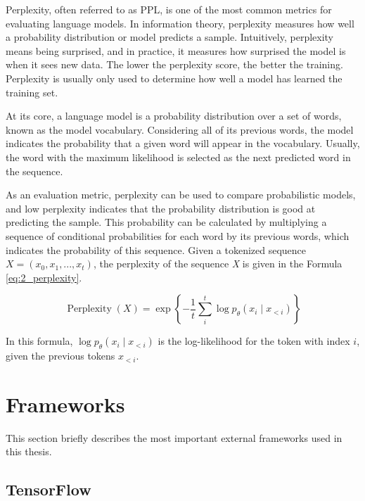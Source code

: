     Perplexity, often referred to as PPL, is one of the most common metrics for evaluating language models. In information theory, perplexity measures how well a probability distribution or model predicts a sample. Intuitively, perplexity means being surprised, and in practice, it measures how surprised the model is when it sees new data. The lower the perplexity score, the better the training. Perplexity is usually only used to determine how well a model has learned the training set. 

    At its core, a language model is a probability distribution over a set of words, known as the model vocabulary. Considering all of its previous words, the model indicates the probability that a given word will appear in the vocabulary. Usually, the word with the maximum likelihood is selected as the next predicted word in the sequence.

    As an evaluation metric, perplexity can be used to compare probabilistic models, and low perplexity indicates that the probability distribution is good at predicting the sample. This probability can be calculated by multiplying a sequence of conditional probabilities for each word by its previous words, which indicates the probability of this sequence.
    Given a tokenized sequence $X = (x_0, x_1, ..., x_t)$, the perplexity of the sequence \textit{X} is given in the Formula \ref{eq:2_perplexity}.
        

    \begin{equation}
    \operatorname{Perplexity}(X)=\exp \left\{-\frac{1}{t} \sum_i^t \log p_\theta\left(x_i \mid x_{<i}\right)\right\}
    \label{eq:2_perplexity}
    \end{equation}

    In this formula, $\log p_\theta\left(x_i \mid x_{<i}\right)$ is the log-likelihood for the token with index $i$, given the previous tokens $x_{<i}$.

\section{Frameworks}
    This section briefly describes the most important external frameworks used in this thesis.
    
    \subsection{TensorFlow}
    
